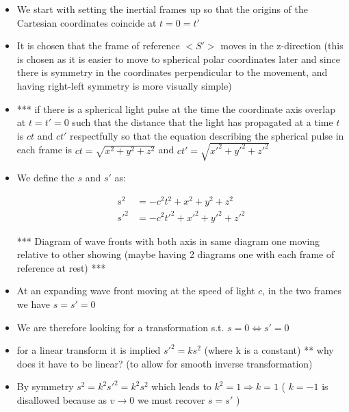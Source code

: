 \begin{itemize}
\setlength\itemsep{0em}

\item We start with setting the inertial frames up so that the origins of the Cartesian coordinates coincide at $t=0=t'$

\item It is chosen that the frame of reference $<S'>$ moves in the z-direction (this is chosen as it is easier to move to spherical polar coordinates later and since there is symmetry in the coordinates perpendicular to the movement, and having right-left symmetry is more visually simple)

\item *** if there is a spherical light pulse at the time the coordinate axis overlap at $t=t'=0$ such that the distance that the light has propagated at a time $t$ is $ct$ and $ct'$ respectfully so that the equation describing the spherical pulse in each frame is $ct = \sqrt{ x^2 + y^2 + z^2 }$ and $ct' = \sqrt{ x'^2 + y'^2 + z'^2 }$

\item We define the $s$ and $s'$ as:

\vspace{-1cm}
\begin{equation}%
\begin{aligned}
 s^2 &= -c^2t^2 + x^2 + y^2 + z^2 \\  s'^2 &= -c^2t'^{2} + x'^2 + y'^2 + z'^2
\end{aligned}
\label{s}
\end{equation}%

*** Diagram of wave fronts with both axis in same diagram one moving relative to other showing  (maybe having 2 diagrams one with each frame of reference at rest) ***

\item At an expanding wave front moving at the speed of light $c$, in the two frames we have $s= s'=0$

\item We are therefore looking for a transformation s.t. $s=0 \Leftrightarrow s'=0$

\item for a linear transform it is implied $s'^2= k s^2$ (where k is a constant) ** why does it have to be linear? (to allow for smooth inverse transformation)

\item By symmetry $ s^2=k^2 s'^2=k^2 s^2$ which leads to $ k^2= 1 \Rightarrow k=1$ ( $k=-1$ is disallowed because as $v\rightarrow 0$ we must recover $s=s'$ )


\end{itemize}
